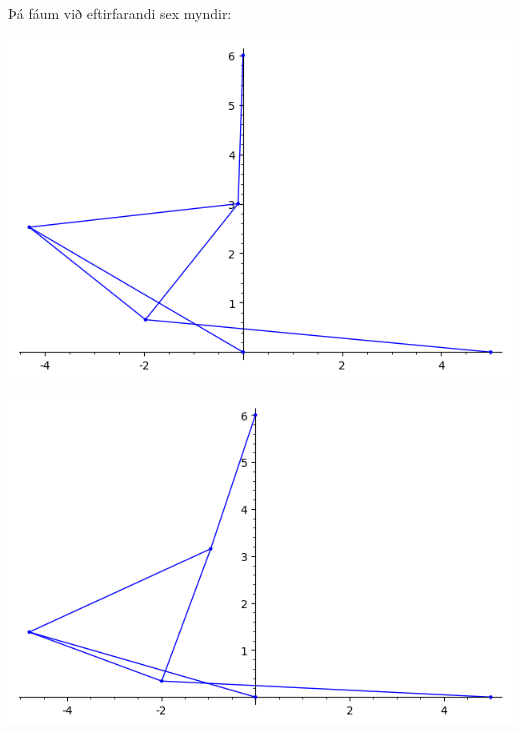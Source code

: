 \documentclass{article}
\begin{document}
\vspace*{0.5cm}

Þá fáum við eftirfarandi sex myndir: \\

\begin{multicols}{2}
\begin{center}
\includegraphics[scale=0.3]{lidur5b1plot}
\end{center}
\columnbreak
\begin{center}
\includegraphics[scale=0.3]{lidur5b2plot}
\end{center}
\end{multicols}
\end{document}
